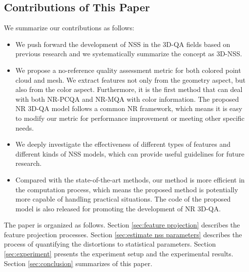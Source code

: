 \documentclass[lettersize,journal]{IEEEtran}
\begin{document}
\subsection{Contributions of This Paper}
We summarize our contributions as follows:
\begin{itemize}
    \item {We push forward the development of NSS in the 3D-QA fields based on previous research \cite{lin2019blind,abouelaziz2018blind,nr-svr} and we systematically summarize the concept as 3D-NSS.} 
    \item We propose a no-reference quality assessment metric for both colored point cloud and mesh. We extract features not only from the geometry aspect, but also from the color aspect. Furthermore, it is the first method that can deal with both NR-PCQA and NR-MQA with color information. The proposed NR 3D-QA model follows a common NR framework, which means it is easy to modify our metric for performance improvement or meeting other specific needs.
    \item We deeply investigate the effectiveness of different types of features and different kinds of NSS models, which can provide useful guidelines for future research.
    \item Compared with the state-of-the-art methods, our method is more efficient in the computation process, which means the proposed method is potentially more capable of handling practical situations. The code of the proposed model is also released for promoting the development of NR 3D-QA.
\end{itemize}

The paper is organized as follows. Section \ref{sec:feature projection} describes the feature projection processes. Section \ref{sec:estimate nss parameters} describes the process of quantifying the distortions to statistical parameters. Section \ref{sec:experiment} presents the experiment setup and the experimental results. Section \ref{sec:conclusion} summarizes of this paper.
\end{document}
